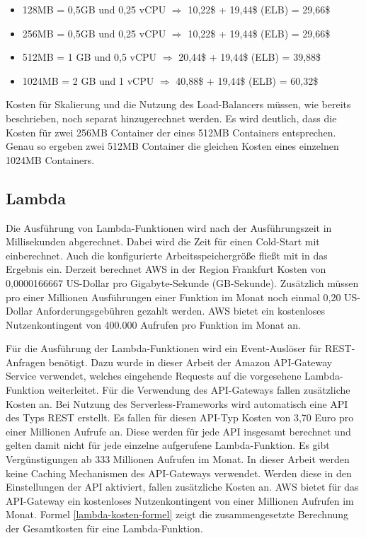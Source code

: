 \begin{itemize}
    \item 128MB = 0,5GB und 0,25 vCPU $\Rightarrow$ 10,22\$ + 19,44\$ (\ac{ELB}) = 29,66\$
    \item 256MB = 0,5GB und 0,25 vCPU $\Rightarrow$ 10,22\$ + 19,44\$ (\ac{ELB}) = 29,66\$
    \item 512MB = 1  GB und 0,5  vCPU $\Rightarrow$ 20,44\$ + 19,44\$ (\ac{ELB}) = 39,88\$
    \item 1024MB = 2 GB und 1    vCPU $\Rightarrow$ 40,88\$ + 19,44\$ (\ac{ELB}) = 60,32\$
\end{itemize}

\noindent
Kosten für Skalierung und die Nutzung des Load-Balancers müssen, wie bereits beschrieben, noch separat hinzugerechnet werden. Es wird deutlich, dass die Kosten für zwei 256MB Container der eines 512MB Containers entsprechen. Genau so ergeben zwei 512MB Container die gleichen Kosten eines einzelnen 1024MB Containers. 

\subsection{Lambda}
\label{subsec:kosten-lambda}
Die Ausführung von Lambda-Funktionen wird nach der Ausführungszeit in Millisekunden abgerechnet. Dabei wird die Zeit für einen Cold-Start mit einberechnet. Auch die konfigurierte Arbeitsspeichergröße fließt mit in das Ergebnis ein. Derzeit berechnet \ac{AWS} in der Region Frankfurt Kosten von 0,0000166667 US-Dollar pro Gigabyte-Sekunde (GB-Sekunde). Zusätzlich \linebreak müssen pro einer Millionen Ausführungen einer Funktion im Monat noch einmal 0,20 US-Dollar Anforderungsgebühren gezahlt werden. \ac{AWS} bietet ein kostenloses Nutzenkontingent von 400.000 Aufrufen pro Funktion im Monat an\cite{noauthor_lambda_nodate-2}.

Für die Ausführung der Lambda-Funktionen wird ein Event-Auslöser für REST-Anfragen benötigt. Dazu wurde in dieser Arbeit der Amazon API-Gateway Service verwendet, welches eingehende Requests auf die vorgesehene Lambda-Funktion weiterleitet. Für die Verwendung des API-Gateways fallen zusätzliche Kosten an. Bei Nutzung des Serverless-Frameworks wird automatisch eine API des Typs REST erstellt. Es fallen für diesen API-Typ Kosten von 3,70 Euro pro einer Millionen Aufrufe an. Diese werden für jede API insgesamt berechnet und gelten damit nicht für jede einzelne aufgerufene Lambda-Funktion. Es gibt Vergünstigungen ab 333 Millionen Aufrufen im Monat. In dieser Arbeit werden keine Caching Mechanismen des API-Gateways verwendet. Werden diese in den Einstellungen der API aktiviert, fallen zusätzliche Kosten an. \ac{AWS} bietet für das API-Gateway ein kostenloses Nutzenkontingent von einer Millionen Aufrufen im Monat\cite{noauthor_amazon_nodate-2}. Formel \ref{lambda-kosten-formel} zeigt die zusammengesetzte Berechnung der Gesamtkosten für eine Lambda-Funktion.

